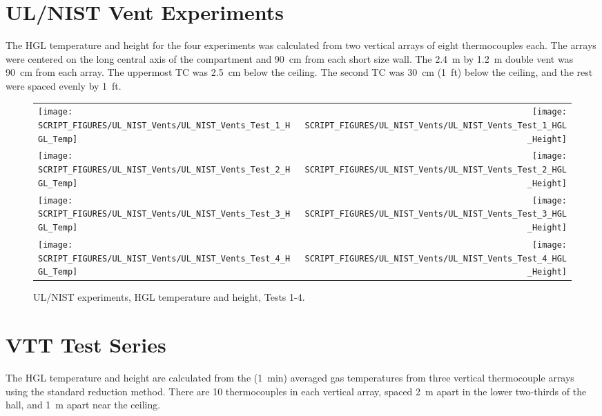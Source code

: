 \section{UL/NIST Vent Experiments}

The HGL temperature and height for the four experiments was calculated from two vertical arrays of eight thermocouples each. The arrays were centered on the long central axis of the compartment and 90~cm from each short size wall. The 2.4~m by 1.2~m double vent was 90~cm from each array. The uppermost TC was 2.5~cm below the ceiling. The second TC was 30~cm (1~ft) below the ceiling, and the rest were spaced evenly by 1~ft.

\newpage

\begin{figure}[p]
\begin{tabular*}{\textwidth}{l@{\extracolsep{\fill}}r}
\texttt{[image: SCRIPT\_FIGURES/UL\_NIST\_Vents/UL\_NIST\_Vents\_Test\_1\_HGL\_Temp]} &
\texttt{[image: SCRIPT\_FIGURES/UL\_NIST\_Vents/UL\_NIST\_Vents\_Test\_1\_HGL\_Height]} \\
\texttt{[image: SCRIPT\_FIGURES/UL\_NIST\_Vents/UL\_NIST\_Vents\_Test\_2\_HGL\_Temp]} &
\texttt{[image: SCRIPT\_FIGURES/UL\_NIST\_Vents/UL\_NIST\_Vents\_Test\_2\_HGL\_Height]} \\
\texttt{[image: SCRIPT\_FIGURES/UL\_NIST\_Vents/UL\_NIST\_Vents\_Test\_3\_HGL\_Temp]} &
\texttt{[image: SCRIPT\_FIGURES/UL\_NIST\_Vents/UL\_NIST\_Vents\_Test\_3\_HGL\_Height]} \\
\texttt{[image: SCRIPT\_FIGURES/UL\_NIST\_Vents/UL\_NIST\_Vents\_Test\_4\_HGL\_Temp]} &
\texttt{[image: SCRIPT\_FIGURES/UL\_NIST\_Vents/UL\_NIST\_Vents\_Test\_4\_HGL\_Height]}
\end{tabular*}
\caption[UL/NIST experiments, HGL temperature and height, Tests 1-4]
{UL/NIST experiments, HGL temperature and height, Tests 1-4.}
\label{UL_NIST_HGL}
\end{figure}

\clearpage

\section{VTT Test Series}

The HGL temperature and height are calculated from the (1~min) averaged gas temperatures from three vertical thermocouple arrays using the standard reduction method. There are 10 thermocouples in each vertical array, spaced 2~m apart in the lower two-thirds of the hall, and 1~m apart near the ceiling.

